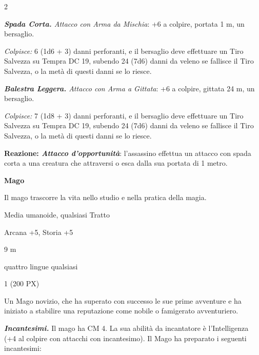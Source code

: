 \begin{multicols}{2}
{\emph{\textbf{Spada Corta.} Attacco con Arma da Mischia}: +6 a colpire, portata 1 m, un bersaglio.

\emph{Colpisce:} 6 (1d6 + 3) danni perforanti, e il bersaglio deve effettuare un Tiro Salvezza su Tempra DC 19, subendo 24 (7d6) danni da veleno se fallisce il Tiro Salvezza, o la metà di questi danni se lo riesce.

\emph{\textbf{Balestra Leggera.} Attacco con Arma a Gittata}: +6 a colpire, gittata 24 m, un bersaglio.

\emph{Colpisce:} 7 (1d8 + 3) danni perforanti, e il bersaglio deve effettuare un Tiro Salvezza su Tempra DC 19, subendo 24 (7d6) danni da veleno se fallisce il Tiro Salvezza, o la metà di questi danni se lo riesce.

\textbf{Reazione: \emph{Attacco d'opportunità}}: l'assassino effettua un attacco con spada corta a una creatura che attraversi o esca dalla sua portata di 1 metro.

\medskip\textbf{Mago}

Il mago trascorre la vita nello studio e nella pratica della magia.

\begin{description}[noitemsep, topsep=0pt, parsep=0pt, partopsep=0pt, itemsep=1pt, leftmargin=2.35cm,  labelwidth=2.2cm, itemindent=0cm, listparindent=0pt] %
\setlength{\baselineskip}{10pt}
\item[\textbf{Taglia/Tipo}] Media umanoide, qualsiasi Tratto
\item[\textbf{Caratt.}] 
\item[\textbf{Punti Ferita}] 
\item[\textbf{Comp.}] Arcana +5, Storia +5
\item[\textbf{Tiri Salvez.}] 
\item[\textbf{Movimento}] 9 m
\item[\textbf{Linguaggi}] quattro lingue qualsiasi
\item[\textbf{Sfida}] 1 (200 PX)
\end{description}
\smallskip

Un Mago novizio, che ha superato con successo le sue prime avventure e ha iniziato a stabilire una reputazione come nobile o famigerato avventuriero.

\emph{\textbf{Incantesimi.}} Il mago ha CM 4. La sua abilità da incantatore è l'Intelligenza (+4 al colpire con attacchi con incantesimo). Il Mago ha preparato i seguenti incantesimi:

}
\end{multicols}
